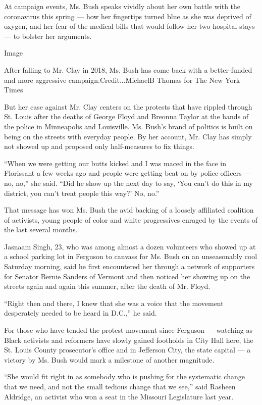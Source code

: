 At campaign events, Ms. Bush speaks vividly about her own battle with
the coronavirus this spring --- how her fingertips turned blue as she
was deprived of oxygen, and her fear of the medical bills that would
follow her two hospital stays --- to bolster her arguments.

Image

After falling to Mr. Clay in 2018, Ms. Bush has come back with a
better-funded and more aggressive campaign.Credit...MichaelB Thomas for
The New York Times

But her case against Mr. Clay centers on the protests that have rippled
through St. Louis after the deaths of George Floyd and Breonna Taylor at
the hands of the police in Minneapolis and Louisville. Ms. Bush's brand
of politics is built on being on the streets with everyday people. By
her account, Mr. Clay has simply not showed up and proposed only
half-measures to fix things.

``When we were getting our butts kicked and I was maced in the face in
Florissant a few weeks ago and people were getting beat on by police
officers --- no, no,'' she said. ``Did he show up the next day to say,
`You can't do this in my district, you can't treat people this way?' No,
no.''

That message has won Ms. Bush the avid backing of a loosely affiliated
coalition of activists, young people of color and white progressives
enraged by the events of the last several months.

Jasnaam Singh, 23, who was among almost a dozen volunteers who showed up
at a school parking lot in Ferguson to canvass for Ms. Bush on an
unseasonably cool Saturday morning, said he first encountered her
through a network of supporters for Senator Bernie Sanders of Vermont
and then noticed her showing up on the streets again and again this
summer, after the death of Mr. Floyd.

``Right then and there, I knew that she was a voice that the movement
desperately needed to be heard in D.C.,'' he said.

For those who have tended the protest movement since Ferguson ---
watching as Black activists and reformers have slowly gained footholds
in City Hall here, the St. Louis County prosecutor's office and in
Jefferson City, the state capital --- a victory by Ms. Bush would mark a
milestone of another magnitude.

``She would fit right in as somebody who is pushing for the systematic
change that we need, and not the small tedious change that we see,''
said Rasheen Aldridge, an activist who won a seat in the Missouri
Legislature last year.

